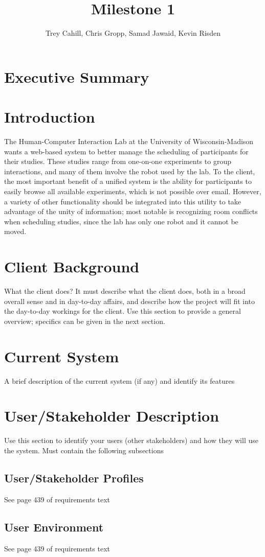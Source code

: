\documentclass{article}
\title{Milestone 1}
\author{Trey Cahill, Chris Gropp, Samad Jawaid, Kevin Risden}
\begin{document}
\maketitle
\section{Executive Summary}
\section{Introduction}
The Human-Computer Interaction Lab at the University of Wisconsin-Madison wants a web-based system to better manage the scheduling of participants for their studies.  These studies range from one-on-one experiments to group interactions, and many of them involve the robot used by the lab.  To the client, the most important benefit of a unified system is the ability for participants to easily browse all available experiments, which is not possible over email.  However, a variety of other functionality should be integrated into this utility to take advantage of the unity of information; most notable is recognizing room conflicts when scheduling studies, since the lab has only one robot and it cannot be moved.
\section{Client Background}
What the client does? It must describe what the client does, both in a broad overall sense and in day-to-day affairs, and describe how the project will fit into the day-to-day workings for the client. Use this section to provide a general overview; specifics can be given in the next section.
\section{Current System}
A brief description of the current system (if any) and identify its features
\section{User/Stakeholder Description}
Use this section to identify your users (other stakeholders) and how they will use the system. Must contain the following subsections
\subsection{User/Stakeholder Profiles}
See page 439 of requirements text
\subsection{User Environment}
See page 439 of requirements text
\end{document}
